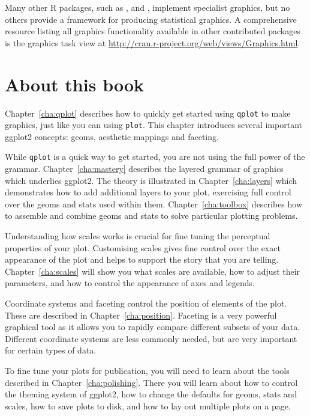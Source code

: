 Many other R packages, such as  \citep{meyer:2006},  \citep{plotrix} and  \citep{gplots}, implement specialist graphics, but no others provide a framework for producing statistical graphics.  A comprehensive resource listing all graphics functionality available in other contributed packages is the graphics task view at \url{http://cran.r-project.org/web/views/Graphics.html}.  

\section{About this book}

Chapter~\ref{cha:qplot} describes how to quickly get started using {\tt qplot} to make graphics, just like you can using {\tt plot}.  This chapter introduces several important ggplot2 concepts: geoms, aesthetic mappings and faceting.
  
While {\tt qplot} is a quick way to get started, you are not using the full power of the grammar.  Chapter~\ref{cha:mastery} describes the layered grammar of graphics which underlies ggplot2.  The theory is illustrated in Chapter~\ref{cha:layers} which demonstrates how to add additional layers to your plot, exercising full control over the geoms and stats used within them.  Chapter~\ref{cha:toolbox} describes how to assemble and combine geoms and stats to solve particular plotting problems.

Understanding how scales works is crucial for fine tuning the perceptual properties of your plot.  Customising scales gives fine control over the exact appearance of the plot and helps to support the story that you are telling.  Chapter~\ref{cha:scales} will show you what scales are available, how to adjust their parameters, and how to control the appearance of axes and legends.

Coordinate systems and faceting control the position of elements of the plot.  These are described in Chapter~\ref{cha:position}.  Faceting is a very powerful graphical tool as it allows you to rapidly compare different subsets of your data.  Different coordinate systems are less commonly needed, but are very important for certain types of data.

To fine tune your plots for publication, you will need to learn about the tools described in Chapter~\ref{cha:polishing}.  There you will learn about how to control the theming system of ggplot2, how to change the defaults for geoms, stats and scales, how to save plots to disk, and how to lay out multiple plots on a page.


